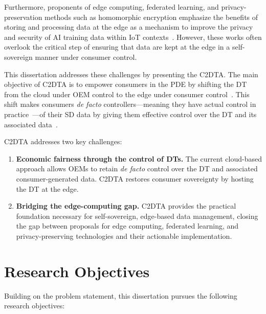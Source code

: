 Furthermore, proponents of edge computing, federated learning, and privacy-preservation methods such as homomorphic encryption emphasize the benefits of storing and processing data at the edge as a mechanism to improve the privacy and security of \ac{AI} training data within \ac{IoT} contexts~\cite{idc:ai:2024,shi:cao:zhang:li:xu:2016,mcmahan:moore:ramage:hampson:arcas:2017,yang:liu:chen:tian:2019,li:sahu:talwalkar:smith:2020}.
However, these works often overlook the critical step of ensuring that data are kept at the edge in a self-sovereign manner under consumer control.

This dissertation addresses these challenges by presenting the \ac{C2DTA}.
The main objective of \ac{C2DTA} is to empower consumers in the \ac{PDE} by shifting the \ac{DT} from the cloud under \ac{OEM} control to the edge under consumer control~\cite{spiekermann:korunovska:boenisch:2019}.
This shift makes consumers \emph{de facto} controllers---meaning they have actual control in practice~\cite{finck:2018}---of their \ac{SD} data by giving them effective control over the \ac{DT} and its associated data~\cite{de:hert:papakonstantinou:2016}.

\ac{C2DTA} addresses two key challenges:
\begin{enumerate}
    \item \textbf{Economic fairness through the control of \acp{DT}.} The current cloud-based approach allows \acp{OEM} to retain \emph{de facto} control over the \ac{DT} and associated consumer-generated data. \ac{C2DTA} restores consumer sovereignty by hosting the \ac{DT} at the edge.
    \item \textbf{Bridging the edge-computing gap.} \ac{C2DTA} provides the practical foundation necessary for self-sovereign, edge-based data management, closing the gap between proposals for edge computing, federated learning, and privacy-preserving technologies and their actionable implementation.
\end{enumerate}

\section{Research Objectives}
\label{sec:objectives}

\noindent Building on the problem statement, this dissertation pursues the following research objectives:

